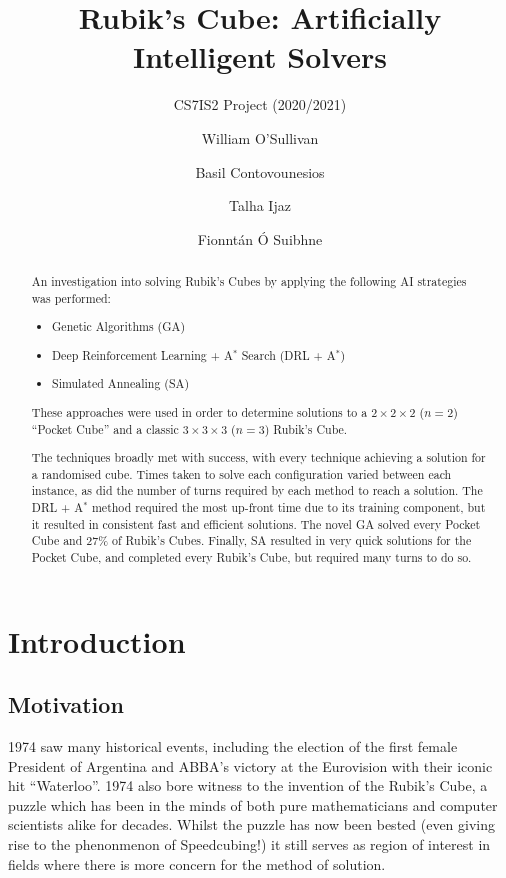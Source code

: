 \documentclass[UKenglish]{libraries/svproc}
\title{Rubik's Cube: Artificially Intelligent Solvers}
\subtitle{CS7IS2 Project (2020/2021)}
\author{
  William O'Sullivan   \and
  Basil Contovounesios \and
  Talha Ijaz           \and
  Fionnt\'an \'O Suibhne}
\institute{\email{
    wosulliv@tcd.ie,
    contovob@tcd.ie,
    ijazm@tcd.ie,
    suibhnef@tcd.ie}}
\begin{document}
\mainmatter
\maketitle              %

\begin{abstract}

An investigation into solving Rubik's Cubes by applying the following AI strategies was performed:
\begin{itemize}
    \item Genetic Algorithms (GA)
    \item Deep Reinforcement Learning + A$^{\ast}$ Search (DRL + A$^{\ast}$)
    \item Simulated Annealing (SA)
\end{itemize}
These approaches were used in order to determine solutions to a $2\times 2\times 2$ ($n=2$) ``Pocket Cube'' and a classic $3\times 3\times 3$ ($n=3$) Rubik's Cube.

The techniques broadly met with success, with every technique achieving a solution for a randomised cube. Times taken to solve each configuration varied between each instance, as did the number of turns required by each method to reach a solution. The DRL + A$^{\ast}$ method required the most up-front time due to its training component, but it resulted in consistent fast and efficient solutions. The novel GA solved every Pocket Cube and 27\% of Rubik's Cubes. Finally, SA resulted in very quick solutions for the Pocket Cube, and completed every Rubik's Cube, but required many turns to do so.


\end{abstract}

\section{Introduction}

\subsection{Motivation}
1974 saw many historical events, including the election of the first female President of Argentina and ABBA's victory at the Eurovision with their iconic hit ``Waterloo''. 1974 also bore witness to the invention of the Rubik's Cube, a puzzle which has been in the minds of both pure mathematicians and computer scientists alike for decades. Whilst the puzzle has now been bested (even giving rise to the phenonmenon of Speedcubing!) it still serves as region of interest in fields where there is more concern for the method of solution.
\end{document}
